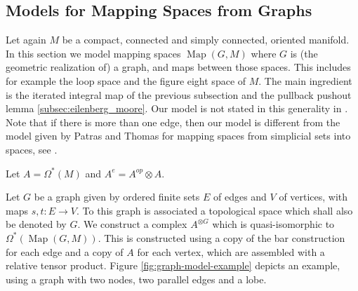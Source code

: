 \documentclass{scrartcl}
\theoremstyle{plain}
\theoremstyle{definition}
\renewcommand{\epsilon}{\varepsilon}
\DeclareMathOperator{\Map}{Map}
\DeclareMathOperator{\Sh}{Sh}
\DeclareMathOperator{\sgn}{sgn}
\begin{document}


\subsection{Models for Mapping Spaces from Graphs}\label{subsec:graph-models}
Let again $M$ be a compact, connected and simply connected, oriented manifold. In this section we model mapping spaces $\Map(G, M)$ where $G$ is (the geometric realization of) a graph, and maps between those spaces. This includes for example the loop space and the figure eight space of $M$. The main ingredient is the iterated integral map of the previous subsection and the pullback pushout lemma \ref{subsec:eilenberg_moore}. Our model is not stated in this generality in \cite{naef2019string}. Note that if there is more than one edge, then our model is different from the model given by Patras and Thomas for mapping spaces from simplicial sets into spaces, see \cite{patras2003cochain}.

Let $A =\Omega^*(M)$ and $A^e=A^{op}\otimes A$. 

Let $G$ be a graph given by ordered finite sets $E$ of edges and $V$ of vertices, with maps $s, t\colon E\to V$. To this graph is associated a topological space which shall also be denoted by $G$. We construct a complex $A^{\otimes G}$ which is quasi-isomorphic to $\Omega^*(\Map(G, M))$. This is constructed using a copy of the bar construction for each edge and a copy of $A$ for each vertex, which are assembled with a relative tensor product. Figure \ref{fig:graph-model-example} depicts an example, using a graph with two nodes, two parallel edges and a lobe. 
\end{document}
